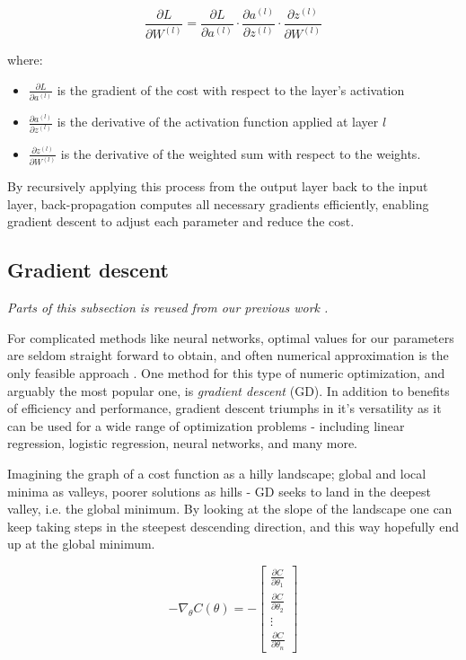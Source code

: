 \begin{equation}
\frac{\partial L}{\partial W^{(l)}} = \frac{\partial L}{\partial a^{(l)}} \cdot \frac{\partial a^{(l)}}{\partial z^{(l)}} \cdot \frac{\partial z^{(l)}}{\partial W^{(l)}}
\end{equation}

where:
\begin{itemize}[label=--]
    \item $\frac{\partial L}{\partial a^{(l)}}$ is the gradient of the cost with respect to the layer’s activation
    \item $\frac{\partial a^{(l)}}{\partial z^{(l)}}$ is the derivative of the activation function applied at layer $l$
    \item $\frac{\partial z^{(l)}}{\partial W^{(l)}}$ is the derivative of the weighted sum with respect to the weights.
\end{itemize}

By recursively applying this process from the output layer back to the input layer, back-propagation computes all necessary gradients efficiently, enabling gradient descent to adjust each parameter and reduce the cost.

\subsection{Gradient descent}\label{sec:gd}
\textit{Parts of this subsection is reused from our previous work \citep[p. 4-6]{project2}.}

For complicated methods like neural networks, optimal values for our parameters are seldom straight forward to obtain, and often numerical approximation is the only feasible approach \citep[Week 40]{morten}.  
One method for this type of numeric optimization, and arguably the most popular one, is \textit{gradient descent} (GD). In addition to benefits of efficiency and performance, gradient descent triumphs in it's versatility as it can be used for a wide range of optimization problems - including linear regression, logistic regression, neural networks, and many more. 

Imagining the graph of a cost function as a hilly landscape; global and local minima as valleys, poorer solutions as hills - GD seeks to land in the deepest valley, i.e. the global minimum. 
By looking at the slope of the landscape one can keep taking steps in the steepest descending direction, and this way hopefully end up at the global minimum.

\begin{equation}\label{eq:gd}
    -\nabla_\theta C(\theta) = -\begin{bmatrix}
\frac{\partial C}{\partial \theta_1} \\
\frac{\partial C}{\partial \theta_2} \\
\vdots \\
\frac{\partial C}{\partial \theta_n}
\end{bmatrix}
\end{equation}

